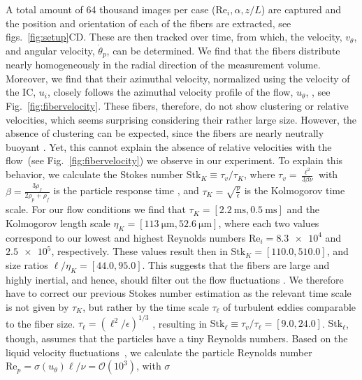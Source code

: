 \documentclass[aps, pre, onecolumn, superscriptaddress,longbibliography]{revtex4-1}
\begin{document}
A total amount of 64 thousand images per case
($\text{Re}_i, \alpha, z/L$) are captured and the position and orientation of each of the fibers are extracted, see figs.~\ref{fig:setup}CD. 
These are then tracked over time,
from which, the velocity, $v_\theta$, and angular velocity,
$\dot{\theta}_p$, can be determined. We find that the fibers distribute nearly
homogeneously in the radial direction of the measurement volume. Moreover, we find that their
azimuthal velocity, normalized using the velocity of the IC,
$u_i$, closely follows the azimuthal velocity profile of the flow, $u_\theta$,
\cite{Huisman2013}, see Fig.~\ref{fig:fibervelocity}. These fibers, therefore,
do not show clustering or relative velocities, which seems surprising
considering their rather large size.  However, the absence of clustering can
be expected, since the fibers are nearly neutrally buoyant
\cite{Calzavarini2008, Calzavarini2009, Fiabane2012}. Yet, this cannot explain
the absence of relative velocities with the flow~(see
Fig.~\ref{fig:fibervelocity}) we observe in our experiment. To explain this
behavior, we calculate the Stokes number $\text{Stk}_K \equiv \tau_v/\tau_K$,
where $\tau_v = \frac{\ell^2}{3 \beta \nu}$ with $\beta =
\frac{3\rho_f}{2\rho_p + \rho_f}$ is the particle response time
\cite{Qureshi2007}, and $\tau_K = \sqrt{\frac{\nu}{\epsilon}}$ is the
Kolmogorov time scale. For our flow conditions we find that $\tau_K =
[\SI{2.2}{\milli\second},\SI{0.5}{\milli\second}]$ and the Kolmogorov length
scale $\eta_K = [\SI{113}{\micro\metre},\SI{52.6}{\micro\metre}]$, where each
two values correspond to our lowest and highest Reynolds numbers $\text{Re}_i
= \num{8.3e4}$ and $\num{2.5e5}$, respectively. These values result then in
$\text{Stk}_K = [110.0, 510.0]$, and size ratios $\ell/\eta_K = [44.0, 95.0]$. This
suggests that the fibers are large and highly inertial, and hence, should
filter out the flow fluctuations \cite{Calzavarini2009, Bec2010,
Marchioli2010, Parsa2011, Marchioli2013, Voth2017}.  We therefore have to
correct our previous Stokes number estimation as the relevant time scale is
not given by $\tau_K$, but rather by the time scale $\tau_\ell$ of turbulent
eddies comparable to the fiber size. $\tau_\ell = \left( \ell^2 / \epsilon
\right)^{1/3}$ \cite{Xu2008}, resulting in $\text{Stk}_\ell \equiv
\tau_v/\tau_\ell = [9.0, 24.0]$. $\text{Stk}_\ell$, though, assumes that the
particles have a tiny Reynolds numbers.  Based on the liquid velocity
fluctuations~\cite{Calzavarini2009}, we calculate the particle Reynolds number
$\text{Re}_p = \sigma(u_\theta) \ell / \nu = \mathcal{O}(10^3)$, with $\sigma$
\end{document}
